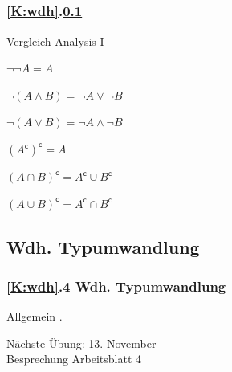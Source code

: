 \documentclass[9pt,german]{beamer}%
\begin{document}
\subsection{\stitle}\label{S:Morgansche}
\begin{frame}[fragile]%
  \frametitle{\ref{K:wdh}.\ref{S:Morgansche} \stitle}%
Vergleich Analysis I
\medskip

\begin{description}
  \item[und bzw. oder]
  \item $\neg \neg A = A$
  \item $\neg (A \wedge B) = \neg A \vee \neg B$
  \item $\neg (A \vee B) = \neg A \wedge \neg B$
\end{description}
\medskip

\begin{description}
  \item[Schnittmenge bzw. Vereinigung]
  \item $(A^{\mathsf{c}})^{\mathsf{c}} = A$
  \item $(A \cap B)^{\mathsf{c}} = A^{\mathsf{c}} \cup B^{\mathsf{c}}$
  \item $(A \cup B)^{\mathsf{c}} = A^{\mathsf{c}} \cap B^{\mathsf{c}}$
\end{description}

\end{frame}


\setcounter{exercise}{9}

\def\stitle{Wdh. Typumwandlung}
\subsection{\stitle}\label{S:Typumwandlung}
\begin{frame}[fragile]%
  \frametitle{\ref{K:wdh}.4 \stitle}%
\medskip

Allgemein .


\end{frame}
\setcounter{exercise}{10}

\setcounter{exercise}{11}

\setcounter{exercise}{12}



\begin{frame}
\centering
\Huge{}
\vspace{2cm}

{\LARGE
N\"achste \"Ubung: 13. November\\
Besprechung Arbeitsblatt 4
}
\end{frame}


\end{document}
